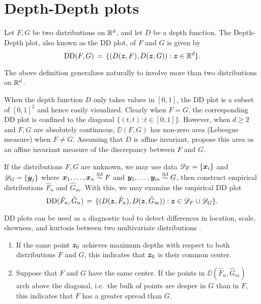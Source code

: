 \section{Depth-Depth plots}

\begin{definition}[DD plot] \label{def:ddplot}
    Let $F, G$ be two distributions on $\mathbb{R}^d$, and let $D$ be a depth
    function. The Depth-Depth plot, also known as the DD plot, of $F$ and $G$
    is given by
    \begin{equation}
        \operatorname{DD}(F, G) \,=\, \{(D(\bm{z}, F), D(\bm{z}, G)) : \bm{z} \in \mathbb{R}^d\}.
    \end{equation}
\end{definition}
\begin{remark}
    The above definition generalizes naturally to involve more than two
    distributions on $\mathbb{R}^d$.
\end{remark}

When the depth function $D$ only takes values in $[0, 1]$, the DD plot is a
subset of $[0, 1]^2$ and hence easily visualized.
Clearly when $F = G$, the corresponding DD plot is confined to the diagonal
$\{(t, t) : t \in [0, 1]\}$.
However, when $d \geq 2$ and $F, G$ are absolutely continuous, $\DD(F, G)$ has
non-zero area (Lebesgue measure) when $F \neq G$.
Assuming that $D$ is affine invariant, \textcite{liu-parelius-singh-1999}
propose this area as an affine invariant measure of the discrepancy between
$F$ and $G$.

If the distributions $F, G$ are unknown, we may use data $\mathscr{D}_F =
\{\bm{x}_i\}$ and $\mathscr{D}_G = \{\bm{y}_j\}$ where $\bm{x}_1, \dots, \bm{x}_n \overset{\text{iid}}{\sim} F$
and $\bm{y}_1, \dots, \bm{y}_m \overset{\text{iid}}{\sim} G$, then construct empirical distributions
$\hat{F}_n$ and $\hat{G}_m$.
With this, we may examine the empirical DD plot
\begin{equation}
    \operatorname{DD}(\hat{F}_n, \hat{G}_n) \,=\, \{(D(\bm{z}, \hat{F}_n), D(\bm{z}, \hat{G}_m)) : \bm{z} \in \mathscr{D}_F \cup \mathscr{D}_G\}.
\end{equation}

DD plots can be used as a diagnostic tool to detect differences in location,
scale, skewness, and kurtosis between two multivariate distributions
\parencite{liu-parelius-singh-1999}.
\begin{enumerate}[itemsep=0em]
    \item If the same point $\bm{z}_0$ achieves maximum depths with respect to
    both distributions $F$ and $G$, this indicates that $\bm{z}_0$ is their
    common center.

    \item Suppose that $F$ and $G$ have the same center. If the points in
    $\DD(\hat{F}_n, \hat{G}_m)$ arch above the diagonal, i.e.\ the bulk of
    points are deeper in $G$ than in $F$, this indicates that $F$ has a
    greater spread than $G$.
\end{enumerate}
